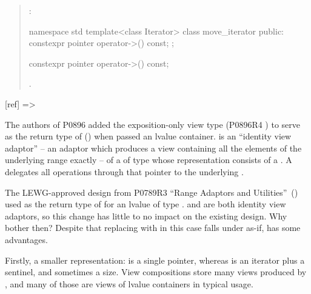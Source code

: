 \begin{itemize}
\begin{quote}
\begin{addedblock}
:
\begin{codeblock}
namespace std {
  template<class Iterator>
  class move_iterator {
  public:
    constexpr pointer operator->() const;
  };
}
\end{codeblock}
\begin{itemdecl}
constexpr pointer operator->() const;
\end{itemdecl}
\begin{itemdescr}
\pnum \returns {}.
\end{itemdescr}
  \end{addedblock}
  \end{quote}
\end{itemize}


[ref]{ => }

The authors of P0896 added the exposition-only view type 
(P0896R4 ) to serve as the return type of  
() when passed an lvalue container.
 is an ``identity view adaptor'' --
an adaptor which produces a view containing all the elements of the underlying
range exactly -- of a  of type  whose representation
consists of a . A  delegates all
operations through that pointer to the underlying .

The LEWG-approved design from
P0789R3 ``Range Adaptors and Utilities''~(\cite{P0789})
used  as the return type of
 for an lvalue  of type .
 and  are both identity view adaptors, so
this change has little to no impact on the existing design. Why bother then?
Despite that replacing  with  in this case
falls under as-if,  has some advantages.

Firstly, a smaller representation:  is a single pointer,
whereas  is an iterator plus a sentinel, and sometimes a size.
View compositions store many views produced by , and many of
those are views of lvalue containers in typical usage.

